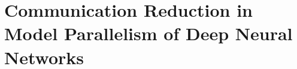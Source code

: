 \chapter{Communication Reduction in Model Parallelism of Deep Neural Networks}
\label{chap:altsplit}

%
%
%
%
%
